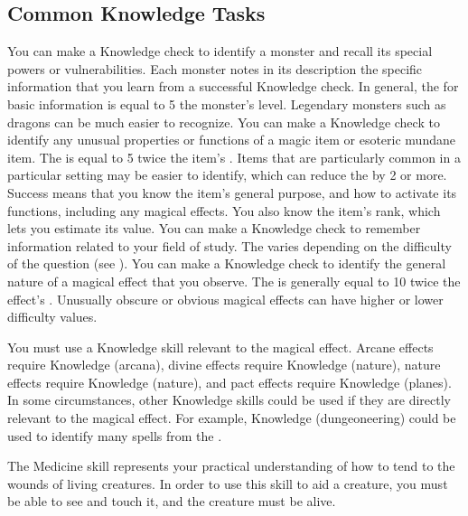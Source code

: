     \subsection{Common Knowledge Tasks}
         You can make a Knowledge check to identify a monster and recall its special powers or vulnerabilities.
        Each monster notes in its description the specific information that you learn from a successful Knowledge check.
        In general, the  for basic information is equal to 5 \add the monster's level.
        Legendary monsters such as dragons can be much easier to recognize.
         You can make a Knowledge check to identify any unusual properties or functions of a magic item or esoteric mundane item.
        The  is equal to 5 \add twice the item's .
        Items that are particularly common in a particular setting may be easier to identify, which can reduce the  by 2 or more.
        Success means that you know the item's general purpose, and how to activate its functions, including any magical effects.
        You also know the item's rank, which lets you estimate its value.
         You can make a Knowledge check to remember information related to your field of study.
        The  varies depending on the difficulty of the question (see ).
         You can make a Knowledge check to identify the general nature of a magical effect that you observe.
        The  is generally equal to 10 \add twice the effect's .
        Unusually obscure or obvious magical effects can have higher or lower difficulty values.

        You must use a Knowledge skill relevant to the magical effect.
        Arcane effects require Knowledge (arcana), divine effects require Knowledge (nature), nature effects require Knowledge (nature), and pact effects require Knowledge (planes).
        In some circumstances, other Knowledge skills could be used if they are directly relevant to the magical effect.
        For example, Knowledge (dungeoneering) could be used to identify many spells from the  .

\newpage
{}
    The Medicine skill represents your practical understanding of how to tend to the wounds of living creatures.
    In order to use this skill to aid a creature, you must be able to see and touch it, and the creature must be alive.


